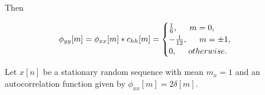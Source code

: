 \begin{exmp}
	Then
	
	\begin{align*}
		\phi_{yy}[m] &= \phi_{xx}[m] \ast c_{hh}[m] = 
		\begin{cases}
			\frac{1}{6}, \hspace{0.5cm} m = 0, \\
			-\frac{1}{12}, \hspace{0.5cm} m = \pm 1, \\
			0, \hspace{0.5cm} otherwise.
		\end{cases}
	\end{align*}
	
\end{exmp}

\begin{exmp}
	Let $x[n]$ be a stationary random sequence with mean $m_x = 1$ and an autocorrelation function given by $\phi_{xx}[m] = 2\delta[m]$.
\end{exmp}

